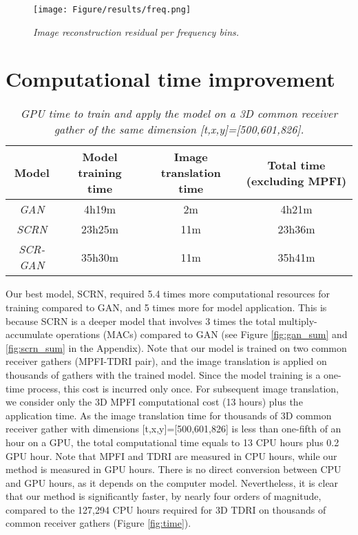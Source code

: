 \begin{figure}[ht]
	\centering
	\texttt{[image: Figure/results/freq.png]} %
	\caption{\textit{Image reconstruction residual per frequency bins.}}
	\label{fig:freqhist}
\end{figure}


\section{Computational time improvement}
\begin{table}[ht]
	\centering
	\begin{tabular}{cccc}
		\hline
		\textbf{Model} & \textbf{Model training time} & \textbf{Image translation time} & \textbf{Total time (excluding MPFI)} \\
		\hline
		\textit{GAN} & 4h19m & 2m & 4h21m\\
		\textit{SCRN} & 23h25m & 11m & 23h36m\\
		\textit{SCR-GAN} & 35h30m & 11m & 35h41m\\
		\hline
	\end{tabular}
	\caption{\textit{GPU time to train and apply the model on a 3D common receiver gather of the same dimension [t,x,y]=[500,601,826].}}
	\label{tab:cputime}
\end{table}

\noindent Our best model, SCRN, required 5.4 times more computational resources for training compared to GAN, and 5 times more for model application. This is because SCRN is a deeper model that involves 3 times the total multiply-accumulate operations (MACs) compared to GAN (see Figure \ref{fig:gan_sum} and \ref{fig:scrn_sum} in the Appendix). Note that our model is trained on two common receiver gathers (MPFI-TDRI pair), and the image translation is applied on thousands of gathers with the trained model. Since the model training is a one-time process, this cost is incurred only once. For subsequent image translation, we consider only the 3D MPFI computational cost (13 hours) plus the application time. As the image translation time for thousands of 3D common receiver gather with dimensions [t,x,y]=[500,601,826] is less than one-fifth of an hour on a GPU, the total computational time equals to 13 CPU hours plus 0.2 GPU hour. Note that MPFI and TDRI are measured in CPU hours, while our method is measured in GPU hours. There is no direct conversion between CPU and GPU hours, as it depends on the computer model. Nevertheless, it is clear that our method is significantly faster, by nearly four orders of magnitude, compared to the 127,294 CPU hours required for 3D TDRI on thousands of common receiver gathers (Figure \ref{fig:time}).

